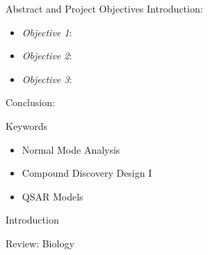 


\setlength{\belowcaptionskip}{2ex}
\setlength\belowdisplayshortskip{2ex}
\begin{frame}[t]
\begin{columns}[t]
\begin{column}{\onecolwid} %
\begin{alertblock}{Abstract and Project Objectives}
Introduction:
\begin{itemize}
\item \textit{Objective 1}: 
\item \textit{Objective 2}: 
\item \textit{Objective 3}: 
\end{itemize}
Conclusion:
\end{alertblock}
\begin{block}{Keywords}
\begin{itemize}
\item Normal Mode Analysis
\item Compound Discovery Design I
\item QSAR Models
\end{itemize}	
\end{block}
\begin{alertblock}{Introduction}
\end{alertblock}
\begin{alertblock}{Review: Biology}


\end{alertblock}
\end{column}
\end{columns}
\end{frame}
